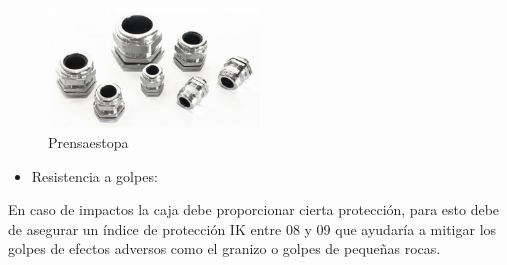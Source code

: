 \begin{figure}[H]
    \centering
    \includegraphics[width=0.5\textwidth]{images/4-DesarrolloTeorico/4-1-caja/CAJA_PRENSAESTOPAS.png}
    \caption{Prensaestopa}
    \label{fig:DesarrolloTeorico/Caja/CAJA_PRENSAESTOPA}
\end{figure}


\begin{itemize}
    \item Resistencia a golpes:
\end{itemize}

En caso de impactos la caja debe proporcionar cierta protección, para esto debe de asegurar un índice de protección IK entre 08 y 09 que ayudaría a mitigar los golpes de efectos adversos como el granizo o golpes de pequeñas rocas.\cite{iecInternationalStandardIEC}
